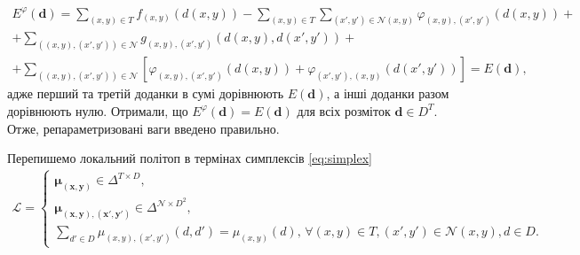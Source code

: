 \begin{equation*}
\begin{gathered}
    E^{\varphi} \left( \pmb{d} \right)
    = \sum \limits_{\left(x, y \right) \in T}
        f_{\left(x, y \right)} \left(d \left(x, y \right) \right)
    - \sum \limits_{\left(x, y \right) \in T}
        \sum \limits_{\left(x', y' \right) \in \mathcal{N} \left(x, y \right)}
            \varphi_{\left(x, y \right), \left(x', y' \right)} \left(
                d \left(x, y \right)
            \right) + \\
    + \sum \limits_{\left( \left(x, y \right), \left( x', y' \right) \right) \in \mathcal{N}}
        g_{\left(x, y \right), \left(x', y' \right)} \left(
            d \left(x, y \right), d \left(x', y' \right)
        \right) + \\
    + \sum \limits_{\left( \left(x, y \right), \left( x', y' \right) \right) \in \mathcal{N}}
        \left[
            \varphi_{\left(x, y \right), \left(x', y' \right)} \left(
                d \left(x, y \right)
            \right)
            + \varphi_{\left(x', y' \right), \left(x, y \right)} \left(
                d \left(x', y' \right)
            \right)
        \right] = E \left(\pmb{d} \right),
\end{gathered}
\end{equation*}
адже перший та третій доданки в сумі дорівнюють $E \left( \pmb{d} \right)$,
а інші доданки разом дорівнюють нулю.
Отримали, що
$E^{\varphi} \left(\pmb{d} \right)
    = E \left(\pmb{d} \right)$
для всіх розміток $\pmb{d} \in D^T$.
Отже, репараметризовані ваги введено правильно.

Перепишемо локальний політоп в термінах симплексів \eqref{eq:simplex}
\begin{equation*}
\begin{gathered}
    \mathcal{L} =
    \begin{cases}
        \pmb{\mu_{\left(x, y \right)}} \in \Delta^{T \times D}, \\
        \pmb{\mu_{ \left(x, y \right), \left(x', y' \right)}} \in
            \Delta^{\mathcal{N} \times D^2}, \\
        \sum \limits_{d' \in D}
            \mu_{\left(x, y \right), \left(x', y' \right)} \left(d, d' \right) =
            \mu_{\left(x, y \right)} \left(d \right), \,
        \forall \left(x, y \right) \in T,
        \left(x', y' \right) \in \mathcal{N} \left(x, y \right),
        d \in D.
    \end{cases}
\end{gathered}
\end{equation*}

